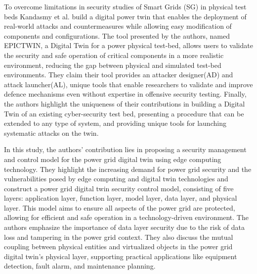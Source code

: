 To overcome limitations in security studies of Smart Grids (SG) in physical test beds Kandasmy et al.\cite{kandasamyElectricPowerDigital2022} build a digital power twin that enables the deployment of real-world attacks and countermeasures while allowing easy modification of components and configurations. The tool presented by the authors, named EPICTWIN, a Digital Twin for a power physical test-bed, allows users to validate the security and safe operation of critical components in a more realistic environment, reducing the gap between physical and simulated test-bed environments. They claim their tool provides an attacker designer(AD) and attack launcher(AL), unique tools that enable researchers to validate and improve defence mechanisms even without expertise in offensive security testing. Finally, the authors highlight the uniqueness of their contributions in building a Digital Twin of an existing cyber-security test bed, presenting a procedure that can be extended to any type of system, and providing unique tools for launching systematic attacks on the twin.

In \cite{sunResearchSecurityManagement2021a} this study, the authors' contribution lies in proposing a security management and control model for the power grid digital twin using edge computing technology. They highlight the increasing demand for power grid security and the vulnerabilities posed by edge computing and digital twin technologies and construct a power grid digital twin security control model, consisting of five layers: application layer, function layer, model layer, data layer, and physical layer. This model aims to ensure all aspects of the power grid are protected, allowing for efficient and safe operation in a technology-driven environment. The authors emphasize the importance of data layer security due to the risk of data loss and tampering in the power grid context. They also discuss the mutual coupling between physical entities and virtualized objects in the power grid digital twin's physical layer, supporting practical applications like equipment detection, fault alarm, and maintenance planning.


